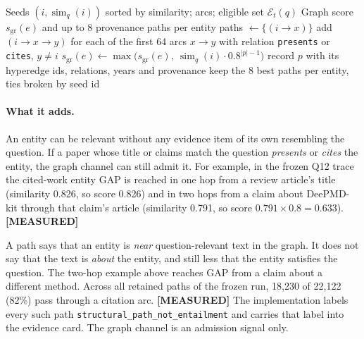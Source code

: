 \documentclass[11pt,a4paper]{article}
\theoremstyle{remark}
\newcommand{\code}[1]{\texttt{\small #1}}
\DeclareMathOperator{\simop}{sim}
\newcommand{\Ent}{\mathcal{E}}
\newcommand{\vtag}[2]{{\sffamily\scriptsize\bfseries\textcolor{#1}{[#2]}}}
\newcommand{\Mtag}{\vtag{measgreen}{MEASURED}}
\begin{document}
\begin{algorithm}[!htbp]
\caption{Bounded graph expansion}
\label{alg:graph}
\begin{algorithmic}[1]
\Require Seeds $(i,\simop_q(i))$ sorted by similarity; arcs; eligible set $\Ent_t(q)$
\Ensure Graph score $s_{\mathrm{gr}}(e)$ and up to 8 provenance paths per entity
    \State paths $\gets\{(i\to x)\}$
      \State add $(i\to x\to y)$ for each of the first 64 arcs $x\to y$ with relation
             \code{presents} or \code{cites}, $y\neq i$
    \EndIf
      \State $s_{\mathrm{gr}}(e)\gets\max\bigl(s_{\mathrm{gr}}(e),\ \simop_q(i)\cdot0.8^{|p|-1}\bigr)$
      \State record $p$ with its hyperedge ids, relations, years and provenance
    \EndFor
  \EndFor
\EndFor
\State keep the 8 best paths per entity, ties broken by seed id
\end{algorithmic}
\end{algorithm}

\paragraph{What it adds.} An entity can be relevant without any evidence item of its own
resembling the question. If a paper whose title or claims match the question
\emph{presents} or \emph{cites} the entity, the graph channel can still admit it.
For example, in the frozen Q12 trace the cited-work entity GAP is reached in one hop from
a review article's title (similarity 0.826, so score 0.826) and in two hops from a claim
about DeePMD-kit through that claim's article (similarity 0.791, so score
$0.791\times0.8=0.633$). \Mtag

\begin{cautionbox}
A path says that an entity is \emph{near} question-relevant text in the graph. It does
not say that the text is \emph{about} the entity, and still less that the entity
satisfies the question. The two-hop example above reaches GAP from a claim about a
different method. Across all retained paths of the frozen run, 18{,}230 of 22{,}122
(82\%) pass through a citation arc. \Mtag{} The implementation labels every such path
\code{structural\_path\_not\_entailment} and carries that label into the evidence card.
The graph channel is an admission signal only.
\end{cautionbox}
\end{document}
